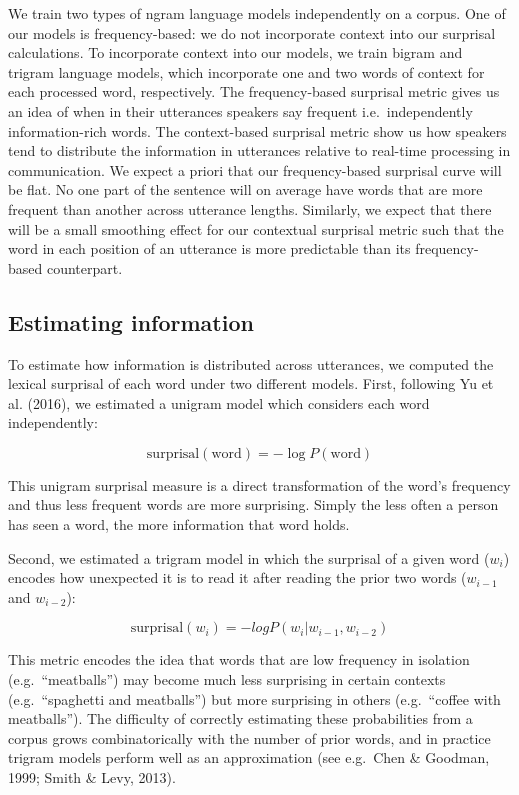 \documentclass[
  english,
  man,floatsintext]{apa6}
\begin{document}
We train two types of ngram language models independently on a corpus. One of our models is frequency-based: we do not incorporate context into our surprisal calculations. To incorporate context into our models, we train bigram and trigram language models, which incorporate one and two words of context for each processed word, respectively. The frequency-based surprisal metric gives us an idea of when in their utterances speakers say frequent i.e.~independently information-rich words. The context-based surprisal metric show us how speakers tend to distribute the information in utterances relative to real-time processing in communication. We expect a priori that our frequency-based surprisal curve will be flat. No one part of the sentence will on average have words that are more frequent than another across utterance lengths. Similarly, we expect that there will be a small smoothing effect for our contextual surprisal metric such that the word in each position of an utterance is more predictable than its frequency-based counterpart.

\hypertarget{estimating-information}{%
\subsection{Estimating information}\label{estimating-information}}

To estimate how information is distributed across utterances, we computed the lexical surprisal of each word under two different models. First, following Yu et al. (2016), we estimated a unigram model which considers each word independently:

\[\text{surprisal}(\text{word}) = -\log P(\text{word})\]

This unigram surprisal measure is a direct transformation of the word's frequency and thus less frequent words are more surprising. Simply the less often a person has seen a word, the more information that word holds.

Second, we estimated a trigram model in which the surprisal of a given word (\(w_i\)) encodes how unexpected it is to read it after reading the prior two words (\(w_{i-1}\) and \(w_{i-2}\)):

\[\text{surprisal}(w_{i}) = -log P(w_i|w_{i-1},w_{i-2})\]

This metric encodes the idea that words that are low frequency in isolation (e.g.~``meatballs'') may become much less surprising in certain contexts (e.g.~``spaghetti and meatballs'') but more surprising in others (e.g.~``coffee with meatballs''). The difficulty of correctly estimating these probabilities from a corpus grows combinatorically with the number of prior words, and in practice trigram models perform well as an approximation (see e.g.~Chen \& Goodman, 1999; Smith \& Levy, 2013).
\end{document}
